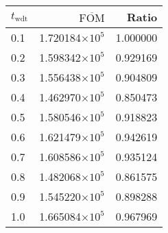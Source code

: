 \begin{tabular}{lrr}
\toprule
$t_{\mathrm{wdt}}$ & $\overline{\mathrm{FOM}}$ &    Ratio \\
\midrule
               0.1 &   1.720184$\times 10^{5}$ & 1.000000 \\
               0.2 &   1.598342$\times 10^{5}$ & 0.929169 \\
               0.3 &   1.556438$\times 10^{5}$ & 0.904809 \\
               0.4 &   1.462970$\times 10^{5}$ & 0.850473 \\
               0.5 &   1.580546$\times 10^{5}$ & 0.918823 \\
               0.6 &   1.621479$\times 10^{5}$ & 0.942619 \\
               0.7 &   1.608586$\times 10^{5}$ & 0.935124 \\
               0.8 &   1.482068$\times 10^{5}$ & 0.861575 \\
               0.9 &   1.545220$\times 10^{5}$ & 0.898288 \\
               1.0 &   1.665084$\times 10^{5}$ & 0.967969 \\
\bottomrule
\end{tabular}
